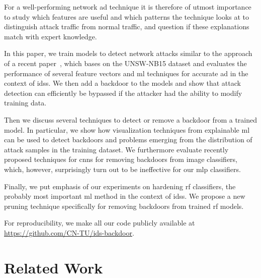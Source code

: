 \documentclass[10pt,sigconf,letterpaper,dvipsnames]{acmart}
\newcommand{\unsw}{UNSW-NB15}
\begin{document}
For a well-performing network \gls{ad} technique it is therefore of utmost importance to study which features are useful and which patterns the technique looks at to distinguish attack traffic from normal traffic, and question if these explanations match with expert knowledge.

In this paper, we train models to detect network attacks similar to the approach of a recent paper~\cite{meghdouri_analysis_2018}, which bases on the \unsw{} dataset \cite{moustafa_unsw-nb15:_2015} and evaluates the performance of several feature vectors and \gls{ml} techniques for accurate \gls{ad} in the context of \glspl{ids}.
We then add a backdoor to the models and show that attack detection can efficiently be bypassed if the attacker had the ability to modify training data.

Then we discuss several techniques to detect or remove a backdoor from a trained model. In particular, we show how visualization techniques from explainable \gls{ml} can be used to detect backdoors and problems emerging from the distribution of attack samples in the training dataset.
We furthermore evaluate recently proposed techniques for \glspl{cnn} for removing backdoors from image classifiers, which, however, surprisingly turn out to be ineffective for our \gls{mlp} classifiers.


Finally, we put emphasis of our experiments on hardening \gls{rf} classifiers, the probably most important \gls{ml} method in the context of \glspl{ids}.
We propose a new pruning technique specifically for removing backdoors from trained \gls{rf} models.

For reproducibility, we make all our code publicly available at \url{https://github.com/CN-TU/ids-backdoor}.

\section{Related Work}
\end{document}
